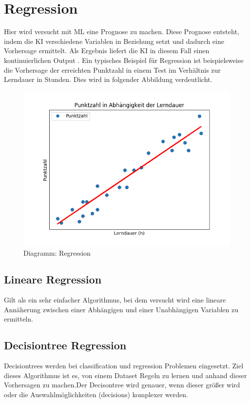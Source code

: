 \section{Regression}
\label{sec:regression}
Hier wird versucht mit \ac{ML} eine Prognose zu machen. Diese Prognose entsteht, indem die KI verschiedene Variablen in Beziehung setzt und dadurch eine Vorhersage ermittelt. Als Ergebnis liefert die KI in diesem Fall einen kontinuierlichen Output \cite[S.~4.]{WML}.  Ein typisches Beispiel für Regression ist beispielsweise die Vorhersage der erreichten Punktzahl in einem Test im Verhältnis zur Lerndauer in Stunden.  Dies wird in folgender Abbildung verdeutlicht.
\begin{figure}
	\includegraphics[width=1.0\textwidth]{../Bilder/machine_learning_regression_with_line.png}
	\caption{Diagramm: Regression}
\end{figure}

\subsection{Lineare Regression}
\label{sec:lineareRegression}
Gilt als ein sehr einfacher Algorithmus, bei dem versucht wird eine lineare Annäherung zwischen einer Abhängigen und einer Unabhängigen Variablen zu ermitteln\cite[S.~100.]{WML}.  


\subsection{Decisiontree Regression}
\label{sec:decisiontreeRegression}
Decisiontrees werden bei classification und regression Problemen eingesetzt. Ziel dieses Algorithmus ist es, von einem Dataset Regeln zu lernen und anhand dieser Vorhersagen zu machen.Der Decisontree wird genauer, wenn dieser größer wird oder die Auswahlmöglichkeiten (decisions) komplexer werden\cite{SKLT}.

